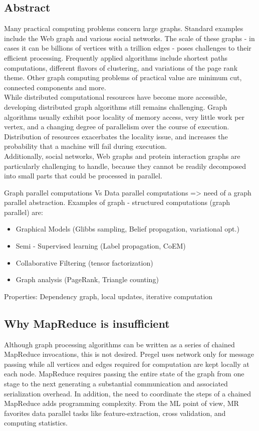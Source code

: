 \documentclass[letterpaper,twocolumn,10pt]{article}
\begin{document}
\subsection*{Abstract}
Many practical computing problems concern large graphs. Standard examples include the Web graph and various social networks. The scale of these graphs - in cases it can be billions of vertices with a trillion edges - poses challenges to their efficient processing.
Frequently applied algorithms include shortest paths computations, different flavors of clustering, and variations of the page rank theme. Other graph computing problems of practical value are minimum cut, connected components and more.\\
While distributed computational resources have become more accessible, developing distributed graph algorithms still remains challenging.
Graph algorithms usually exhibit poor locality of memory access, very little work per vertex, and a changing degree of parallelism over the course of execution. Distribution of resources exacerbates the locality issue, and increases the probability that a machine 
will fail during execution.\\
Additionally, social networks, Web graphs and protein interaction graphs are particularly challenging to handle, because they cannot be readily decomposed into small parts that could be processed in parallel.

Graph parallel computations Vs Data parallel computations => need of a graph parallel abstraction.
Examples of graph - structured computations (graph parallel) are:
\begin{itemize}
	\item Graphical Models (Glibbs sampling, Belief propagation, variational opt.)
	\item Semi - Supervised learning (Label propagation, CoEM)
	\item Collaborative Filtering (tensor factorization)
	\item Graph analysis (PageRank, Triangle counting)
\end{itemize}
Properties: Dependency graph, local updates, iterative computation

\subsection*{Why MapReduce is insufficient}
Although graph processing algorithms can be written as a series of chained MapReduce invocations, this is not desired. Pregel uses network only for message passing while all vertices and edges required for computation are kept locally at each node. MapReduce requires passing the entire state of the graph from one stage to the next generating a substantial communication and associated serialization overhead. In addition, the need to coordinate the steps of a chained MapReduce adds programming complexity.
From the ML point of view, MR favorites data parallel tasks like feature-extraction, cross validation, and computing statistics.
\end{document}
